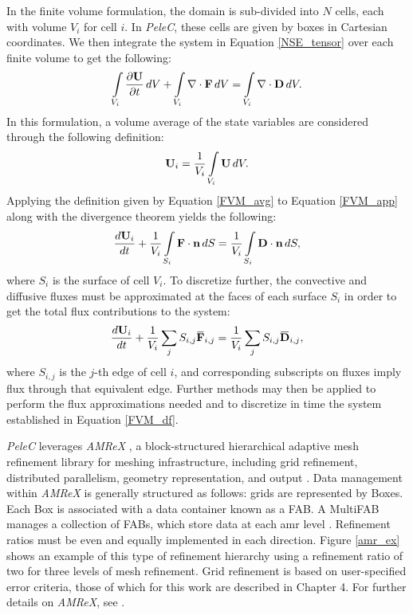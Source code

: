 In the finite volume formulation, the domain is sub-divided into $N$ cells, each with volume $V_i$ for cell $i$. In \textit{PeleC}, these cells are given by boxes in Cartesian coordinates. We then integrate the system in Equation \eqref{NSE_tensor} over each finite volume to get the following:
\begin{equation} \label{FVM_app}
\int\limits_{V_i} \dfrac{\partial \vb{U}}{\partial t}\, dV + \int\limits_{V_i} \nabla \cdot \vb{F}\, dV = \int\limits_{V_i} \nabla \cdot \vb{D}\, dV.
\end{equation}
In this formulation, a volume average of the state variables are considered through the following definition:
\begin{equation} \label{FVM_avg}
\vb{U}_i = \dfrac{1}{V_i} \int\limits_{V_i} \vb{U} \, dV.
\end{equation} 
Applying the definition given by Equation \eqref{FVM_avg} to Equation \eqref{FVM_app} along with the divergence theorem yields the following:
\begin{equation} \label{FVM}
\dfrac{d\vb{U}_i}{dt} + \dfrac{1}{V_i} \int\limits_{S_i} \vb{F}\cdot \vb{n}\, dS = \dfrac{1}{V_i} \int\limits_{S_i} \vb{D} \cdot \vb{n} \, dS, 
\end{equation}
where $S_i$ is the surface of cell $V_i$. To discretize further, the convective and diffusive fluxes must be approximated at the faces of each surface $S_i$ in order to get the total flux contributions to the system:
\begin{equation} \label{FVM_df}
\dfrac{d\vb{U}_i}{dt} +  \dfrac{1}{V_i} \sum\limits_j S_{i,j} \overbar{\vb{F}}_{i,j} =  \dfrac{1}{V_i}\sum\limits_j S_{i,j} \overbar{\vb{D}}_{i,j},
\end{equation}
where $S_{i,j}$ is the $j$-th edge of cell $i$, and corresponding subscripts on fluxes imply flux through that equivalent edge. Further methods may then be applied to perform the flux approximations needed and to discretize in time the system established in Equation \eqref{FVM_df}. 

\textit{PeleC} leverages \textit{AMReX} \cite{amrex1, amrex2, amrex3}, a block-structured hierarchical adaptive mesh refinement library for meshing infrastructure, including grid refinement, distributed parallelism, geometry representation, and output \cite{PeleC1}. Data management within \textit{AMReX} is generally structured as follows: grids are represented by Boxes. Each Box is associated with a data container known as a FAB. A MultiFAB manages a collection of FABs, which store data at each \gls{amr} level \cite{PeleC1}. Refinement ratios must be even and equally implemented in each direction. Figure \ref{amr_ex} shows an example of this type of refinement hierarchy using a refinement ratio of two for three levels of mesh refinement. Grid refinement is based on user-specified error criteria, those of which for this work are described in Chapter 4. For further details on \textit{AMReX}, see \cite{amrex1}. 

